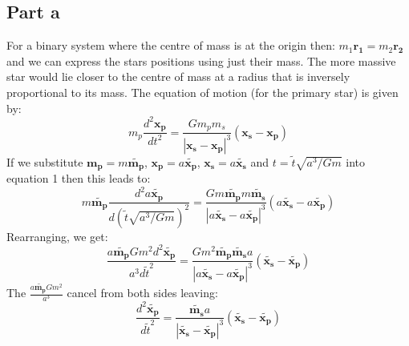 \documentclass[a4paper,12pt]{article}
\begin{document}
\subsection{Part a} 
For a binary system where the centre of mass is at the origin then: $m_1\mathbf{r_1}=m_2\mathbf{r_2}$ and we can express the stars positions using just their mass. The more massive star would lie closer to the centre of mass at a radius that is inversely proportional to its mass.
The equation of motion (for the primary star) is given by:
\begin{equation}
m_p\frac{d^2\mathbf{x_p}}{dt^2}=\frac{Gm_pm_s}{|\mathbf{x_s}-\mathbf{x_p}|^3}\left(\mathbf{x_s}-\mathbf{x_p}\right)
\end{equation}
If we substitute $\mathbf{m_p}=m\mathbf{\tilde{m_p}}$, $\mathbf{x_p}=a\mathbf{\tilde{x_p}}$, $\mathbf{x_s}=a\mathbf{\tilde{x_s}}$ and $t=\tilde{t}\sqrt{a^3/Gm}$ into equation 1 then this leads to:
\begin{equation}
m\mathbf{\tilde{m_p}}\frac{d^2a\mathbf{\tilde{x_p}}}{d\left(\tilde{t}\sqrt{a^3/Gm}\right)^2}=\frac{Gm\mathbf{\tilde{m_p}}m\mathbf{\tilde{m_s}}}{|a\mathbf{\tilde{x_s}}-a\mathbf{\tilde{x_p}}|^3}(a\mathbf{\tilde{x_s}}-a\mathbf{\tilde{x_p}})
\end{equation}
Rearranging, we get:
\begin{equation}
\frac{a\mathbf{\tilde{m_p}}Gm^2d^2\mathbf{\tilde{x_p}}}{a^3d{\tilde{t}}^2}=\frac{Gm^2\mathbf{\tilde{m_p}}\mathbf{\tilde{m_s}}a}{|a\mathbf{\tilde{x_s}}-a\mathbf{\tilde{x_p}}|^3}(\mathbf{\tilde{x_s}}-\mathbf{\tilde{x_p}})
\end{equation}
The $\frac{a\mathbf{\tilde{m_p}}Gm^2}{a^3}$ cancel from both sides leaving:
\begin{equation}
\frac{d^2\mathbf{\tilde{x_p}}}{d\tilde{t}^2}=\frac{\mathbf{\tilde{m_s}}a}{|\mathbf{\tilde{x_s}}-\mathbf{\tilde{x_p}}|^3}(\mathbf{\tilde{x_s}}-\mathbf{\tilde{x_p}})
\end{equation}
\end{document}
